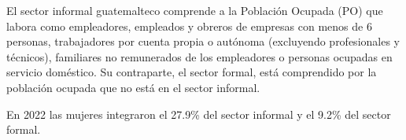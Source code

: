 El sector informal guatemalteco comprende a la Población Ocupada (PO) que labora como empleadores, empleados y obreros de empresas con menos de 6 personas, trabajadores por cuenta propia o autónoma (excluyendo profesionales y técnicos), familiares no remunerados de los empleadores o personas ocupadas en servicio doméstico. Su contraparte, el sector formal, está comprendido por la población ocupada que no está en el sector informal. 

En 2022 las mujeres integraron el 27.9\% del sector informal y el 9.2\% del sector formal. 